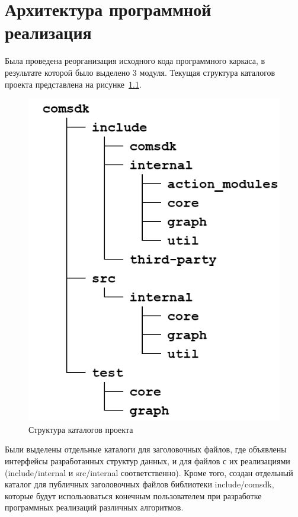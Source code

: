 \chapter{Архитектура программной реализация}\label{chap3_soft_architecture}
Была проведена реорганизация исходного кода программного каркаса, в результате которой было выделено 3 модуля. Текущая структура каталогов проекта представлена на рисунке~\ref{fig:fileStructure}.
\begin{figure}[!ht]
    \centering
    \includegraphics[height=0.35\textheight]{figures/fileStructure.png}
    \caption{Структура каталогов проекта}
    \label{fig:fileStructure}
\end{figure}
Были выделены отдельные каталоги для заголовочных файлов, где объявлены интерфейсы разработанных структур данных, и для файлов с их реализациями (\textsf{include/internal} и \textsf{src/internal} соответственно). Кроме того, создан отдельный каталог для публичных заголовочных файлов библиотеки \textsf{include/comsdk}, которые будут использоваться конечным пользователем при разработке программных реализаций различных алгоритмов.

